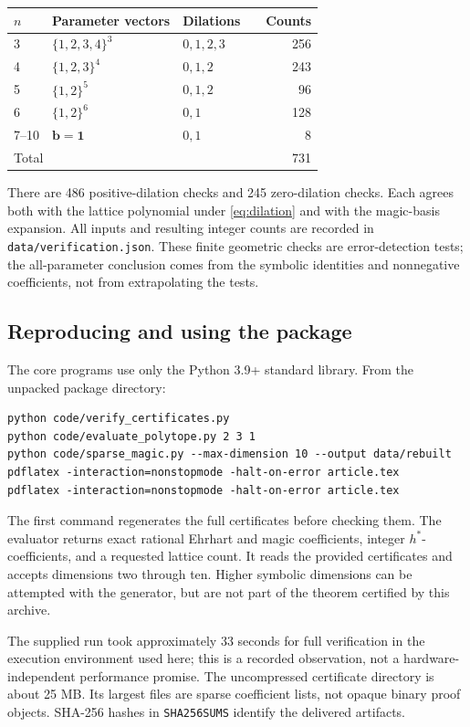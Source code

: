 \documentclass[11pt]{article}
\theoremstyle{definition}
\newcommand{\bb}{\mathbf b}
\newcommand{\one}{\mathbf 1}
\numberwithin{equation}{section}
\begin{document}
\begin{center}
\begin{tabular}{@{}llllr@{}}
\toprule
$n$ & Parameter vectors & Dilations & & Counts\\
\midrule
3 & $\{1,2,3,4\}^3$ & $0,1,2,3$ &&256\\
4 & $\{1,2,3\}^4$ & $0,1,2$ &&243\\
5 & $\{1,2\}^5$ & $0,1,2$ &&96\\
6 & $\{1,2\}^6$ & $0,1$ &&128\\
7--10 & $\bb=\one$ & $0,1$ &&8\\
\midrule
\multicolumn{4}{l}{Total} &731\\
\bottomrule
\end{tabular}
\end{center}
There are 486 positive-dilation checks and 245 zero-dilation checks. Each
agrees both with the lattice polynomial under \eqref{eq:dilation} and
with the magic-basis expansion. All inputs and resulting integer counts
are recorded in \texttt{data/verification.json}. These finite geometric
checks are error-detection tests; the all-parameter conclusion comes
from the symbolic identities and nonnegative coefficients, not from
extrapolating the tests.

\subsection{Reproducing and using the package}
The core programs use only the Python 3.9+ standard library. From the
unpacked package directory:
\begin{lstlisting}
python code/verify_certificates.py
python code/evaluate_polytope.py 2 3 1
python code/sparse_magic.py --max-dimension 10 --output data/rebuilt
pdflatex -interaction=nonstopmode -halt-on-error article.tex
pdflatex -interaction=nonstopmode -halt-on-error article.tex
\end{lstlisting}
The first command regenerates the full certificates before checking them.
The evaluator returns exact rational Ehrhart and magic coefficients,
integer $h^*$-coefficients, and a requested lattice count. It reads the
provided certificates and accepts dimensions two through ten. Higher
symbolic dimensions can be attempted with the generator, but are not
part of the theorem certified by this archive.

The supplied run took approximately 33 seconds for full verification in
the execution environment used here; this is a recorded observation,
not a hardware-independent performance promise. The uncompressed
certificate directory is about 25 MB. Its largest files are sparse
coefficient lists, not opaque binary proof objects. SHA-256 hashes in
\texttt{SHA256SUMS} identify the delivered artifacts.
\end{document}

